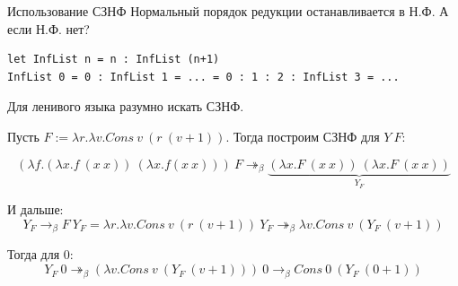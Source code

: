 \documentclass[aspectratio=169]{beamer}
\begin{document}
\begin{frame}[fragile]{Использование СЗНФ}
Нормальный порядок редукции останавливается в Н.Ф. А если Н.Ф. нет?

\begin{verbatim}let InfList n = n : InfList (n+1)
InfList 0 = 0 : InfList 1 = ... = 0 : 1 : 2 : InfList 3 = ...\end{verbatim}

Для ленивого языка разумно искать СЗНФ.

Пусть $F := \lambda r.\lambda v.Cons\ v\ (r\ (v+1))$.
Тогда построим СЗНФ для $Y\ F$:


$$(\lambda f.(\lambda x.f\ (x\ x))\ (\lambda x.f (x\ x)))\ F \twoheadrightarrow_\beta \underbrace{(\lambda x.F\ (x\ x))\ (\lambda x.F\ (x\ x))}_{Y_F}$$

И дальше:
\vspace{-0.3cm}
$$Y_F \rightarrow_\beta F\ Y_F = \lambda r.\lambda v.Cons\ v\ (r\ (v+1))\ Y_F \twoheadrightarrow_\beta \lambda v.Cons\ v\ (Y_F\ (v+1))$$

Тогда для 0:
\vspace{-0.3cm}
$$Y_F\ 0 \twoheadrightarrow_\beta (\lambda v.Cons\ v\ (Y_F\ (v+1)))\ 0 \rightarrow_\beta Cons\ 0\ (Y_F\ (0+1))$$

\end{frame}
\end{document}
